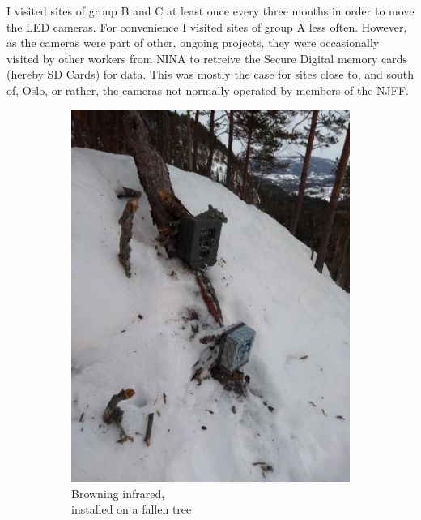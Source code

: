 \begin{figure}
	\label{fig:period_timeseries}
\end{figure}

I visited sites of group B and C at least once every three months in order to move the LED cameras. For convenience I visited sites of group A less often. %
However, as the cameras were part of other, ongoing projects, they were occasionally visited by other workers from NINA to retreive the Secure Digital memory cards (hereby SD Cards) for data. %
This was mostly the case for sites close to, and south of, Oslo, or rather, the cameras not normally operated by members of the NJFF.



\begin{figure}
		\begin{subfigure}{.5\textwidth}
		  \centering
		  	\includegraphics[width=.8\linewidth]{./img/cam_install_example/IMG_20190212_161615169.jpg}
		  \caption{Browning infrared,\\ installed on a fallen tree}
		  	\label{fig:cam_ex_a}
	\end{subfigure}
		\begin{subfigure}{.5\textwidth}

\end{subfigure}
\end{figure}
